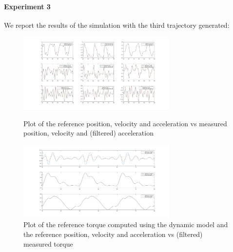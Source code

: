 \documentclass{article}
\begin{document}
\paragraph{Experiment 3}
We report the results of the simulation with the third trajectory generated:
\begin{figure}[!htbp]
\centering
\includegraphics[width=0.7\textwidth]{images/3-dof/experiment3_traj.png}
\caption{Plot of the reference position, velocity and acceleration vs measured position, velocity and (filtered) acceleration}
\includegraphics[width=0.7\textwidth]{images/3-dof/experiment3.png}
\caption{Plot of the reference torque computed using the dynamic model and the reference position, velocity and acceleration vs (filtered) measured torque}
\end{figure}
\pagebreak
\end{document}
